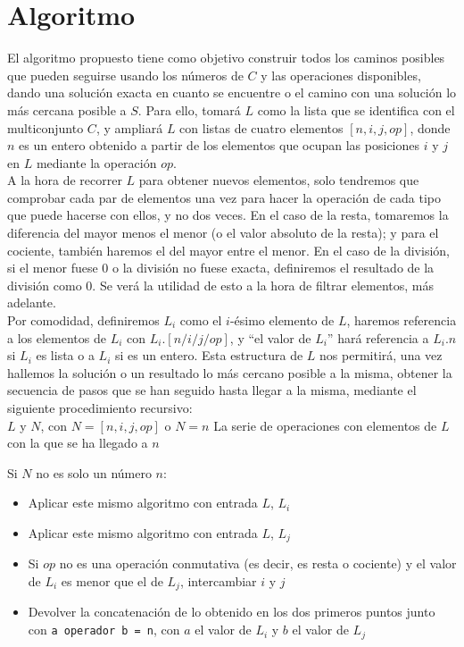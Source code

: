 \section{Algoritmo}
El algoritmo propuesto tiene como objetivo construir todos los caminos posibles
que pueden seguirse usando los números de $C$ y las operaciones disponibles,
dando una solución exacta en cuanto se encuentre o el camino con una solución lo
 más cercana posible a $S$. Para ello, tomará $L$ como la lista que se
identifica con el multiconjunto $C$, y ampliará $L$ con listas de cuatro elementos
$[n, i, j, op]$, donde $n$ es un entero obtenido a partir de los elementos que ocupan
las posiciones $i$ y $j$ en $L$ mediante la operación $op$.\\

A la hora de recorrer $L$ para obtener nuevos elementos, solo tendremos que
comprobar cada par de elementos una vez para hacer la operación de cada tipo que
puede hacerse con ellos, y no dos veces. En el caso de la resta, tomaremos la
diferencia del mayor menos el menor (o el valor absoluto de la resta); y para
el cociente, también haremos el del mayor entre el menor. En el caso de la
división, si el menor fuese $0$ o la división no fuese exacta, definiremos el
resultado de la división como $0$. Se verá la utilidad de esto a la hora de
filtrar elementos, más adelante. \\

Por comodidad,
definiremos $L_i$ como el $i$-ésimo elemento de $L$, haremos referencia a los
elementos de $L_i$ con $L_i.[n/i/j/op]$, y ``el valor de $L_i$'' hará referencia
a $L_i.n$ si $L_i$ es lista o a $L_i$ si es un entero.
Esta estructura de $L$ nos permitirá, una vez hallemos la solución o
un resultado lo más cercano posible a la misma, obtener la secuencia de pasos
que se han seguido hasta llegar a la misma,
mediante el siguiente procedimiento recursivo: \\

{$L$ y $N$, con $N = [n, i, j, op]$ o $N = n$}
{La serie de operaciones con elementos de $L$ con la que se ha llegado a $n$}{
	Si $N$ no es solo un número $n$:
	\begin{itemize}
	\setlength{\itemsep}{1pt}
	\setlength{\parskip}{0pt}
	\setlength{\parsep}{0pt}
	\item Aplicar este mismo algoritmo con entrada $L$, $L_i$
	\item Aplicar este mismo algoritmo con entrada $L$, $L_j$
	\item Si $op$ no es una operación conmutativa (es decir, es resta o cociente)
	y el valor de $L_i$ es menor que el de $L_j$, intercambiar $i$ y $j$
	\item Devolver la concatenación de lo obtenido en los dos primeros puntos
	junto con \texttt{a operador b = n}, con $a$ el valor de $L_i$ y $b$
	el valor de $L_j$
	\end{itemize}
}\\

